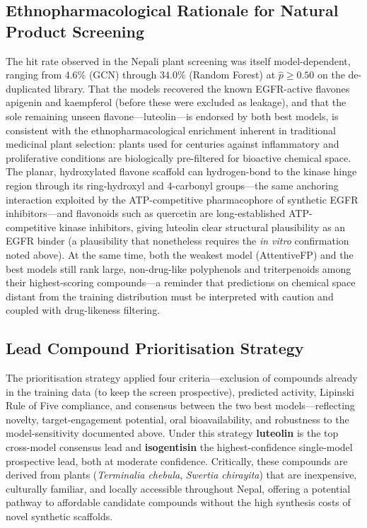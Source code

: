 \subsection{Ethnopharmacological Rationale for Natural Product Screening}

The hit rate observed in the Nepali plant screening was itself model-dependent,
ranging from 4.6\% (GCN) through 34.0\% (Random Forest) at $\hat{p} \geq 0.50$ on the
de-duplicated library. That the models recovered the known EGFR-active flavones
apigenin and kaempferol (before these were excluded as leakage), and that the sole
remaining unseen flavone---luteolin---is endorsed by both best models, is consistent
with the ethnopharmacological enrichment inherent in traditional medicinal plant
selection: plants used for centuries against inflammatory and proliferative conditions
are biologically pre-filtered for bioactive chemical space. The planar, hydroxylated flavone
scaffold can hydrogen-bond to the kinase hinge region through its ring-hydroxyl and
4-carbonyl groups---the same anchoring interaction exploited by the ATP-competitive
pharmacophore of synthetic EGFR inhibitors---and flavonoids such as quercetin are
long-established ATP-competitive kinase inhibitors, giving luteolin clear structural
plausibility as an EGFR binder (a plausibility that nonetheless requires the
\textit{in vitro} confirmation noted above).
At the same time, both the weakest model (AttentiveFP) and the best models still rank
large, non-drug-like polyphenols and triterpenoids among their highest-scoring
compounds---a reminder that predictions on chemical space distant from the training
distribution must be interpreted with caution and coupled with drug-likeness filtering.

\subsection{Lead Compound Prioritisation Strategy}

The prioritisation strategy applied four criteria---exclusion of compounds already in
the training data (to keep the screen prospective), predicted activity, Lipinski Rule
of Five compliance, and consensus between the two best models---reflecting novelty,
target-engagement potential, oral bioavailability, and robustness to the
model-sensitivity documented above. Under this strategy \textbf{luteolin} is the top
cross-model consensus lead and \textbf{isogentisin} the highest-confidence
single-model prospective lead, both at moderate confidence. Critically, these
compounds are derived from plants (\textit{Terminalia chebula}, \textit{Swertia
chirayita}) that are inexpensive, culturally familiar, and locally accessible
throughout Nepal, offering a potential pathway to affordable candidate compounds
without the high synthesis costs of novel synthetic scaffolds.

